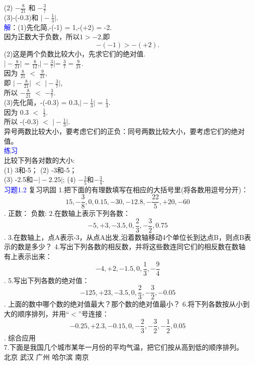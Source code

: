 \documentclass[UTF8]{article}
\begin{document}
	(2) $-\frac{8}{21}$ 和 $-\frac{3}{7}$\\     
	(3)-(-0.3)和 $\vert -\frac{1}{3} \vert$.\\
	\textcolor{blue}{解}：(1)先化简,-(-1) = 1,-(+2) = -2.\\
	因为正数大于负数，所以$1> -2$,即\\
	$$-(-1)>-(+2).$$
	(2)这是两个负数比较大小，先求它们的绝对值.\\
	$\vert -\frac{8}{21} \vert$ = $\frac{8}{12}$,$\vert -\frac{3}{7} \vert $= $\frac{3}{7}=\frac{9}{21}$.\\
	因为 $\frac{8}{21}$ $<$ $\frac{9}{21},$\\
	即	$\vert -\frac{8}{21} \vert $ $<$ $\vert -\frac{3}{7} \vert$,\\
	所以 $-\frac{8}{21}  $ $<$ $ -\frac{3}{7}.$\\
	(3)先化简，-(-0.3) = 0.3,$\vert -\frac{1}{3} \vert$ = $\frac{1}{3}.$\\
	因为 0.3  $<$ $\frac{1}{3}.$\\
	所以 -(-0.3)  $<$ $ \vert -\frac{1}{3} \vert.$\\
	\indent 异号两数比较大小，要考虑它们的正负：同号两数比较大小，要考虑它们的绝对值。\\
	\textcolor{blue}{\heiti 练习}\\
	比较下列各对数的大小:\\
	(1) 3和-5；                        (2) -3和-5；\\
	(3) -2.5和$-\vert -2.25 \vert$;     (4) $-\frac{3}{5}$和$-\frac{3}{4}$.\\
	\textcolor{blue}{\heiti 习题1.2}
	{\heiti 复习巩固}
	1.把下面的有理数填写在相应的大括号里(将各数用逗号分开)：
	$$ 15,-\frac{3}{8},0,0.15,-30,-12.8,-\frac{22}{5},+20,-60 $$.
	正数：${              }$ 负数:$ {               } $
	2.在数轴上表示下列各数：
	$$-5,+3,-3.5,0,\frac{2}{3},-\frac{3}{2},0.75 $$.
	3.在数轴上，点A表示-3，从点A出发,沿着数轴移动4个单位长到达点B，则点B表示的数是多少？
	4.写出下列各数的相反数，并将这些数连同它们的相反数在数轴有上表示出来：
	$$ -4,+2,-1.5,0,\frac{1}{3},-\frac{9}{4} $$.
	5.写出下列各数的绝对值：
	$$-125,+23,-3.5,0,\frac{2}{3},-\frac{3}{2},-0.05$$.
	上面的数中哪个数的绝对值最大？那个数的绝对值最小？
	6.将下列各数按从小到大的顺序排列，并用“$<$”号连接：
	$$-0.25,+2.3,-0.15,0,-\frac{2}{3},-\frac{3}{2},-\frac{1}{2},0.05$$.
	{\heiti 综合应用}\\
	7.下面是我国几个城市某年一月份的平均气温，把它们按从高到低的顺序排列。\\
	北京  武汉  广州  哈尔滨   南京\\
\end{document}
